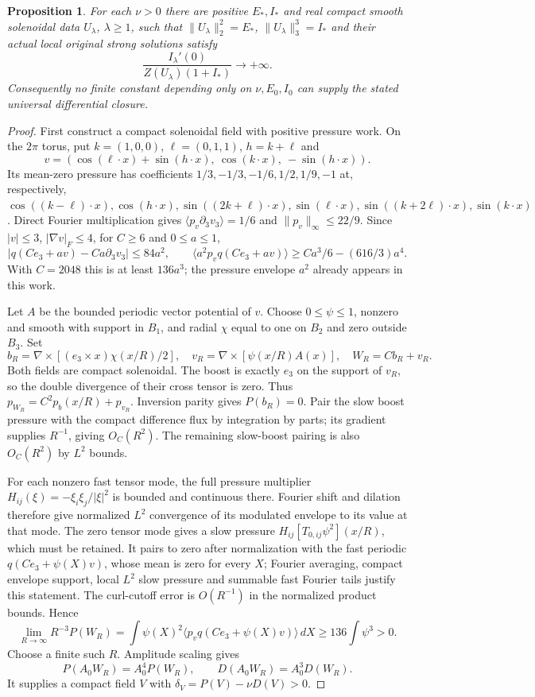 \documentclass[11pt]{article}
\newtheorem{proposition}{Proposition}
\begin{document}
\begin{proposition}
For each $\nu>0$ there are positive $E_*,I_*$ and real compact smooth
solenoidal data $U_\lambda$, $\lambda\ge1$, such that
$\|U_\lambda\|_2^2=E_*$, $\|U_\lambda\|_3^3=I_*$ and their actual
local original strong solutions satisfy
\[
 \frac{I_\lambda'(0)}{Z(U_\lambda)(1+I_*)}\longrightarrow+\infty.
\]
Consequently no finite constant depending only on $\nu,E_0,I_0$
can supply the stated universal differential closure.
\end{proposition}
\begin{proof}
First construct a compact solenoidal field with positive pressure work.
On the $2\pi$ torus, put $k=(1,0,0)$, $\ell=(0,1,1)$, $h=k+\ell$ and
\[
 v=(\cos(\ell\cdot x)+\sin(h\cdot x),\ \cos(k\cdot x),\ -\sin(h\cdot x)).
\]
Its mean-zero pressure has coefficients
$1/3,-1/3,-1/6,1/2,1/9,-1$ at, respectively,
$\cos((k-\ell)\cdot x),\cos(h\cdot x),\sin((2k+\ell)\cdot x),
\sin(\ell\cdot x),\sin((k+2\ell)\cdot x),\sin(k\cdot x)$.
Direct Fourier multiplication gives
$\langle p_v\partial_3v_3\rangle=1/6$ and $\|p_v\|_\infty\le22/9$.
Since $|v|\le3$, $|\nabla v|_F\le4$, for $C\ge6$ and $0\le a\le1$,
\[
 |q(Ce_3+av)-Ca\partial_3v_3|\le84a^2,\qquad
 \langle a^2p_v q(Ce_3+av)\rangle
 \ge Ca^3/6-(616/3)a^4.
\]
With $C=2048$ this is at least $136a^3$; the pressure envelope $a^2$
already appears in this work.

Let $A$ be the bounded periodic vector potential of $v$. Choose
$0\le\psi\le1$, nonzero and smooth with support in $B_1$, and radial
$\chi$ equal to one on $B_2$ and zero outside $B_3$. Set
\[
 b_R=\nabla\times[(e_3\times x)\chi(x/R)/2],\quad
 v_R=\nabla\times[\psi(x/R)A(x)],\quad W_R=Cb_R+v_R.
\]
Both fields are compact solenoidal. The boost is exactly $e_3$ on the
support of $v_R$, so the double divergence of their cross tensor is
zero. Thus $p_{W_R}=C^2p_b(x/R)+p_{v_R}$. Inversion parity gives
$P(b_R)=0$. Pair the slow boost pressure with the compact difference
flux by integration by parts; its gradient supplies $R^{-1}$, giving
$O_C(R^2)$. The remaining slow-boost pairing is also $O_C(R^2)$ by
$L^2$ bounds.

For each nonzero fast tensor mode, the full pressure multiplier
$H_{ij}(\xi)=-\xi_i\xi_j/|\xi|^2$ is bounded and continuous there.
Fourier shift and dilation therefore give normalized $L^2$ convergence
of its modulated envelope to its value at that mode. The zero tensor
mode gives a slow pressure $H_{ij}[T_{0,ij}\psi^2](x/R)$, which must be
retained. It pairs to zero after normalization with the fast periodic
$q(Ce_3+\psi(X)v)$, whose mean is zero for every $X$; Fourier averaging,
compact envelope support, local $L^2$ slow pressure and summable fast
Fourier tails justify this statement. The curl-cutoff error is
$O(R^{-1})$ in the normalized product bounds. Hence
\[
 \lim_{R\to\infty}R^{-3}P(W_R)
 =\int \psi(X)^2\langle p_vq(Ce_3+\psi(X)v)\rangle\,dX
 \ge136\int\psi^3>0.
\]
Choose a finite such $R$. Amplitude scaling gives
\[
 P(A_0W_R)=A_0^4P(W_R),\qquad D(A_0W_R)=A_0^3D(W_R).
\]
It supplies a compact field $V$ with $\delta_V=P(V)-\nu D(V)>0$.


\end{proof}
\end{document}
